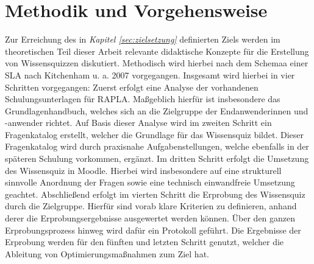 \section{Methodik und Vorgehensweise}
Zur Erreichung des in \textit{Kapitel \ref{sec:zielsetzung}} definierten Ziels werden
im theoretischen Teil dieser Arbeit relevante didaktische Konzepte für die Erstellung von Wissensquizzen
diskutiert. Methodisch wird hierbei nach dem Schemaa einer \ac{SLA} nach Kitchenham u. a. 2007 vorgegangen.
Insgesamt wird hierbei in vier Schritten vorgegangen:
Zuerst erfolgt eine Analyse der vorhandenen Schulungsunterlagen für \ac{RAPLA}.
Maßgeblich hierfür ist insbesondere das Grundlagenhandbuch, welches sich an die Zielgruppe der
Endanwenderinnen und -anwender richtet. Auf Basis dieser Analyse wird im zweiten Schritt
ein Fragenkatalog erstellt, welcher die Grundlage für das Wissensquiz bildet.
Dieser Fragenkatalog wird durch praxisnahe Aufgabenstellungen, welche ebenfalls
in der späteren Schulung vorkommen, ergänzt. Im dritten Schritt erfolgt die Umsetzung
des Wissensquiz in Moodle. Hierbei wird insbesondere auf eine strukturell
sinnvolle Anordnung der Fragen sowie eine technisch einwandfreie Umsetzung geachtet.
Abschließend erfolgt im vierten Schritt die Erprobung des Wissensquiz durch die Zielgruppe.
Hierfür sind vorab klare Kriterien zu definieren, anhand derer die Erprobungsergebnisse
ausgewertet werden können. Über den ganzen Erprobungsprozess hinweg wird dafür
ein Protokoll geführt. Die Ergebnisse der Erprobung werden für den fünften
und letzten Schritt genutzt, welcher die Ableitung von Optimierungsmaßnahmen
zum Ziel hat.
